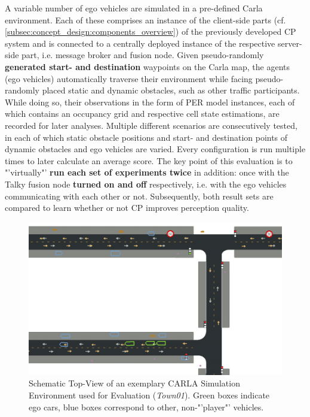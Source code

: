 A variable number of ego vehicles are simulated in a pre-defined Carla environment. Each of these comprises an instance of the client-side parts (cf. \cref{subsec:concept_design:components_overview}) of the previously developed CP system and is connected to a centrally deployed instance of the respective server-side part, i.e. message broker and fusion node. Given pseudo-randomly \textbf{generated start- and destination} waypoints on the Carla map, the agents (ego vehicles) automatically traverse their environment while facing pseudo-randomly placed static and dynamic obstacles, such as other traffic participants. While doing so, their observations in the form of PER model instances, each of which contains an occupancy grid and respective cell state estimations, are recorded for later analyses. Multiple different scenarios are consecutively tested, in each of which static obstacle positions and start- and destination points of dynamic obstacles and ego vehicles are varied. Every configuration is run multiple times to later calculate an average score. The key point of this evaluation is to "'virtually"' \textbf{run each set of experiments twice} in addition: once with the Talky fusion node \textbf{turned on and off} respectively, i.e. with the ego vehicles communicating with each other or not. Subsequently, both result sets are compared to learn whether or not CP improves perception quality.

\begin{figure}
	\centering
	\includegraphics[width=0.9\linewidth]{98_images/evaluation_scene_topview_cropped}
	\caption[Top-View of the Simulation Environment used for Evaluation]{Schematic Top-View of an exemplary CARLA Simulation Environment used for Evaluation (\textit{Town01}). Green boxes indicate ego cars, blue boxes correspond to other, non-"'player"' vehicles.}
	\label{fig:carla_scene_topview}
\end{figure}

